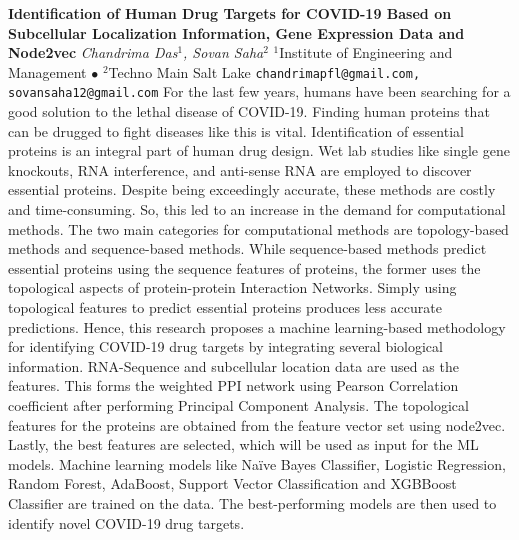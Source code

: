 
    \begin{conf-abstract}[]
        {\textbf{Identification of Human Drug Targets for COVID-19 Based on Subcellular Localization Information, Gene Expression Data and Node2vec}}
        {\textit{Chandrima Das$^{1}$, Sovan Saha$^{2}$}}
        {$^{1}$Institute of Engineering and Management $\bullet$ $^{2}$Techno Main Salt Lake}
        {\texttt{chandrimapfl@gmail.com, sovansaha12@gmail.com}}
        {For the last few years, humans have been searching for a good solution to the lethal disease of COVID-19. Finding human proteins that can be drugged to fight diseases like this is vital. Identification of essential proteins is an integral part of human drug design. Wet lab studies like single gene knockouts, RNA interference, and anti-sense RNA are employed to discover essential proteins. Despite being exceedingly accurate, these methods are costly and time-consuming. So, this led to an increase in the demand for computational methods. The two main categories for computational methods are topology-based methods and sequence-based methods. While sequence-based methods predict essential proteins using the sequence features of proteins, the former uses the topological aspects of protein-protein Interaction Networks. Simply using topological features to predict essential proteins produces less accurate predictions. Hence, this research proposes a machine learning-based methodology for identifying COVID-19 drug targets by integrating several biological information. RNA-Sequence and subcellular location data are used as the features. This forms the weighted PPI network using Pearson Correlation coefficient after performing Principal Component Analysis. The topological features for the proteins are obtained from the feature vector set using node2vec. Lastly, the best features are selected, which will be used as input for the ML models. Machine learning models like Naïve Bayes Classifier, Logistic Regression, Random Forest, AdaBoost, Support Vector Classification and XGBBoost Classifier are trained on the data. The best-performing models are then used to identify novel COVID-19 drug targets.}
    \end{conf-abstract}
        